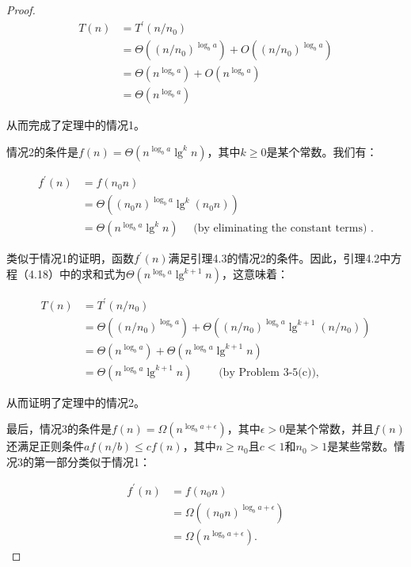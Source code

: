 \documentclass[lang=cn,newtx,10pt,scheme=chinese]{elegantbook}
\begin{document}
\begin{proof}
$$
\begin{aligned}
T(n) & =T^{\prime}\left(n / n_0\right) \\
& =\Theta\left(\left(n / n_0\right)^{\log _b a}\right)+O\left(\left(n / n_0\right)^{\log _b a}\right) \\
& =\Theta\left(n^{\log _b a}\right)+O\left(n^{\log _b a}\right) \\
& =\Theta\left(n^{\log _b a}\right)
\end{aligned}
$$

从而完成了定理中的情况1。

情况2的条件是$f(n)=\Theta\left(n^{\log _b a} \lg ^k n\right)$，其中$k \geq 0$是某个常数。我们有：

$$
\begin{aligned}
f^{\prime}(n) & =f\left(n_0 n\right) \\
& =\Theta\left(\left(n_0 n\right)^{\log _b a} \lg ^k\left(n_0 n\right)\right) \\
& =\Theta\left(n^{\log _b a} \lg ^k n\right) \quad \text { (by eliminating the constant terms) } .
\end{aligned}
$$

类似于情况1的证明，函数$f^{\prime}(n)$满足引理4.3的情况2的条件。因此，引理4.2中方程（4.18）中的求和式为$\Theta\left(n^{\log _b a} \lg ^{k+1} n\right)$，这意味着：

$$
\begin{aligned}
T(n) & =T^{\prime}\left(n / n_0\right) \\
& =\Theta\left(\left(n / n_0\right)^{\log _b a}\right)+\Theta\left(\left(n / n_0\right)^{\log _b a} \lg ^{k+1}\left(n / n_0\right)\right) \\
& =\Theta\left(n^{\log _b a}\right)+\Theta\left(n^{\log _b a} \lg ^{k+1} n\right) \\
& =\Theta\left(n^{\log _b a} \lg ^{k+1} n\right) \quad \quad \text { (by Problem 3-5(c)), }
\end{aligned}
$$

从而证明了定理中的情况2。

最后，情况3的条件是$f(n)=\Omega\left(n^{\log _b a+\epsilon}\right)$，其中$\epsilon>0$是某个常数，并且$f(n)$还满足正则条件$a f(n / b) \leq c f(n)$，其中$n \geq n_0$且$c<1$和$n_0>1$是某些常数。情况3的第一部分类似于情况1：

$$
\begin{aligned}
f^{\prime}(n) & =f\left(n_0 n\right) \\
& =\Omega\left(\left(n_0 n\right)^{\log _b a+\epsilon}\right) \\
& =\Omega\left(n^{\log _b a+\epsilon}\right) .
\end{aligned}
$$


\end{proof}
\end{document}
